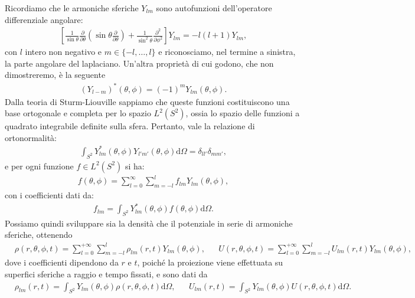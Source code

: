 Ricordiamo che le armoniche sferiche $Y_{lm}$ sono autofunzioni dell'operatore differenziale angolare:
\begin{align}
    \left[ \frac{1}{\sin{\theta}} \frac{\partial}{\partial \theta} \left( \sin{\theta} \frac{\partial}{\partial \theta} \right) + \frac{1}{\sin^2{\theta}} \frac{\partial^2}{\partial \phi^2} \right] Y_{lm} = -l(l+1) Y_{lm},
\end{align}con $l$ intero non negativo e $m \in \{-l, \dots, l\}$ e riconosciamo, nel termine a sinistra, la parte angolare del laplaciano. Un'altra proprietà di cui godono, che non dimostreremo, è la seguente
\begin{align}
	(Y_{l-m})^*(\theta, \phi) = (-1)^m Y_{lm}(\theta, \phi).
\end{align}
Dalla teoria di Sturm-Liouville sappiamo che queste funzioni costituiscono una base ortogonale e completa per lo spazio $L^2(S^2)$, ossia lo spazio delle funzioni a quadrato integrabile definite sulla sfera. Pertanto, vale la relazione di ortonormalità:
\begin{align}
    \int_{S^2} Y_{lm}^*(\theta, \phi) Y_{l'm'}(\theta, \phi) \mathrm{d}\Omega = \delta_{ll'} \delta_{mm'},
\end{align}
e per ogni funzione $f \in L^2(S^2)$ si ha:
\begin{align}
f(\theta, \phi) = \sum_{l=0}^{\infty} \sum_{m=-l}^l f_{lm} Y_{lm}(\theta, \phi),
\end{align}
con i coefficienti dati da:
\begin{align}
f_{lm} = \int_{S^2} Y_{lm}^*(\theta, \phi) f(\theta, \phi) \mathrm{d}\Omega.
\end{align}
Possiamo quindi sviluppare sia la densità che il potenziale in serie di armoniche sferiche, ottenendo
\begin{align}
    &\rho(r, \theta, \phi, t) = \sum_{l=0}^{+\infty} \sum_{m=-l}^l \rho_{lm}(r, t) Y_{lm}(\theta, \phi), & &U(r, \theta, \phi, t) = \sum_{l=0}^{+\infty} \sum_{m=-l}^l U_{lm}(r, t) Y_{lm}(\theta, \phi),
\end{align}
dove i coefficienti dipendono da $r$ e $t$, poiché la proiezione viene effettuata su superfici sferiche a raggio e tempo fissati, e sono dati da
\begin{align}
    &\rho_{lm}(r, t) = \int_{S^2} Y_{lm}(\theta, \phi) \rho(r, \theta, \phi, t) \mathrm{d}\Omega, &
    &U_{lm}(r, t) = \int_{S^2} Y_{lm}(\theta, \phi) U(r, \theta, \phi, t) \mathrm{d}\Omega.
\end{align}

